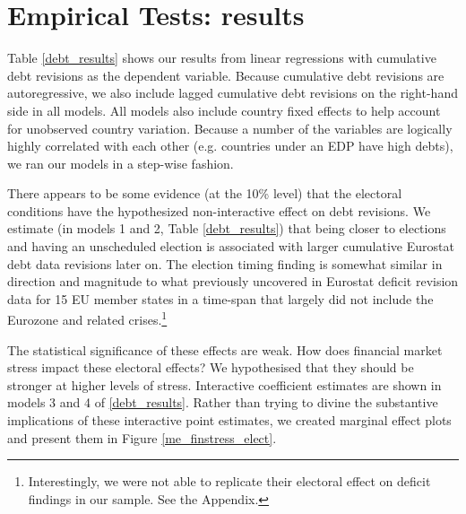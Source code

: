 \documentclass[]{article}
\begin{document}
\section{Empirical Tests: results}

Table \ref{debt_results} shows our results from linear regressions with cumulative debt revisions as the dependent variable. Because cumulative debt revisions are autoregressive, we also include lagged cumulative debt revisions on the right-hand side in all models. All models also include country fixed effects to help account for unobserved country variation. Because a number of the variables are logically highly correlated with each other (e.g. countries under an EDP have high debts), we ran our models in a step-wise fashion.

There appears to be some evidence (at the 10\% level) that the electoral conditions have the hypothesized non-interactive effect on debt revisions. We estimate (in models 1 and 2, Table \ref{debt_results}) that being closer to elections and having an unscheduled election is associated with larger cumulative Eurostat debt data revisions later on. The election timing finding is somewhat similar in direction and magnitude to what \cite{DeCastro2013} previously uncovered in Eurostat deficit revision data for 15 EU member states in a time-span that largely did not include the Eurozone and related crises.\footnote{Interestingly, we were not able to replicate their electoral effect on deficit findings in our sample. See the Appendix.}

The statistical significance of these effects are weak. How does financial market stress impact these electoral effects? We hypothesised that they should be stronger at higher levels of stress. Interactive coefficient estimates are shown in models 3 and 4 of \ref{debt_results}. Rather than trying to divine the substantive implications of these interactive point estimates, we created marginal effect plots and present them in Figure \ref{me_finstress_elect}.
\end{document}
